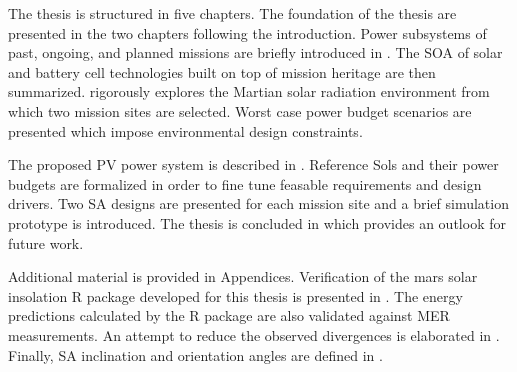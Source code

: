 The thesis is structured in five chapters. The foundation of the thesis are presented in the two chapters following the introduction. Power subsystems of past, ongoing, and planned missions are briefly introduced in . The \ac{SOA} of solar and battery cell technologies built on top of mission heritage are then summarized.  rigorously explores the Martian solar radiation environment from which two mission sites are selected. Worst case power budget scenarios are presented which impose environmental design constraints.

The proposed \ac{PV} power system is described in . Reference Sols and their power budgets are formalized in order to fine tune feasable requirements and design drivers. Two \ac{SA} designs are presented for each mission site and a brief simulation prototype is introduced. The thesis is concluded in  which provides an outlook for future work.

Additional material is provided in Appendices. Verification of the mars solar insolation R package developed for this thesis is presented in . The energy predictions calculated by the R package are also validated against \ac{MER} measurements. An attempt to reduce the observed divergences is elaborated in . Finally, \ac{SA} inclination and orientation angles are defined in .
